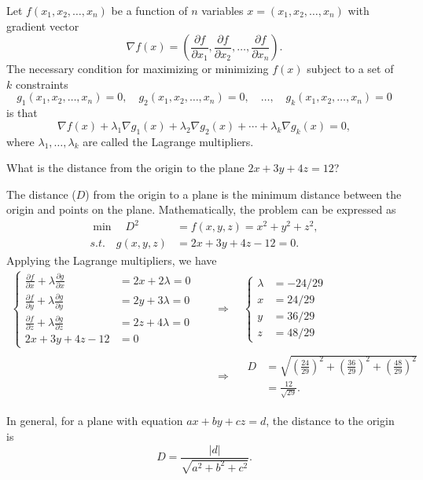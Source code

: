 Let \(f(x_1,x_2,\ldots,x_n)\) be a function of \(n\) variables \(x=(x_1,x_2,\ldots,x_n)\) with gradient vector
\[
\nabla f(x)=\left(\frac{\partial f}{\partial x_1},\frac{\partial f}{\partial x_2},\ldots,\frac{\partial f}{\partial x_n}\right).
\]
The necessary condition for maximizing or minimizing \(f(x)\) subject to a set of \(k\) constraints
\[
g_1(x_1,x_2,\ldots,x_n)=0,\quad g_2(x_1,x_2,\ldots,x_n)=0,\quad\ldots,\quad g_k(x_1,x_2,\ldots,x_n)=0
\]
is that
\[
\nabla f(x)+\lambda_1\nabla g_1(x)+\lambda_2\nabla g_2(x)+\cdots+\lambda_k\nabla g_k(x)=0,
\]
where \(\lambda_1,\ldots,\lambda_k\) are called the Lagrange multipliers.

\begin{problem}{What is the distance from the origin to the plane \(2x+3y+4z=12\)?}
\end{problem}

\begin{solution}
The distance (\(D\)) from the origin to a plane is the minimum distance between the origin and points on the plane. Mathematically, the problem can be expressed as
\[
\begin{aligned}
\min\quad D^2&=f(x,y,z)=x^2+y^2+z^2,\\
\textit{s.t.}\quad g(x,y,z)&=2x+3y+4z-12=0.
\end{aligned}
\]
Applying the Lagrange multipliers, we have
\[
\begin{aligned}
\left\{
\begin{aligned}
\frac{\partial f}{\partial x}+\lambda\frac{\partial g}{\partial x}&=2x+2\lambda=0\\
\frac{\partial f}{\partial y}+\lambda\frac{\partial g}{\partial y}&=2y+3\lambda=0\\
\frac{\partial f}{\partial z}+\lambda\frac{\partial g}{\partial z}&=2z+4\lambda=0\\
2x+3y+4z-12&=0
\end{aligned}
\right.
&\quad\Rightarrow\quad
\left\{
\begin{aligned}
\lambda&=-24/29\\
x&=24/29\\
y&=36/29\\
z&=48/29
\end{aligned}
\right.
\\
&\quad\Rightarrow\quad
\begin{aligned}
D&=\sqrt{\left(\frac{24}{29}\right)^2+\left(\frac{36}{29}\right)^2+\left(\frac{48}{29}\right)^2}\\
 &=\frac{12}{\sqrt{29}}.
\end{aligned}
\end{aligned}
\]

In general, for a plane with equation \(ax+by+cz=d\), the distance to the origin is
\[
D=\frac{|d|}{\sqrt{a^2+b^2+c^2}}.
\]
\end{solution}

